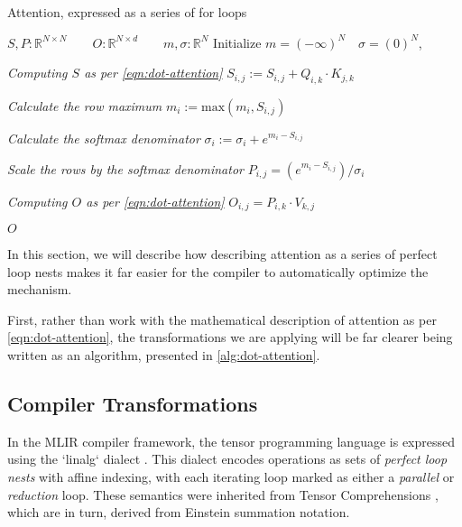 \documentclass[review, anonymous, sigplan]{acmart}
\begin{document}
\begin{algorithm}
  \caption{Attention, expressed as a series of for loops\label{alg:dot-attention}}
  \begin{algorithmic}[1]

    \State $S, P : \mathbb{R}^{N \times N} \qquad 
            O : \mathbb{R}^{N \times d} \qquad
            m, \sigma :\mathbb{R}^N$
    \State Initialize $m = (-\infty)^N \quad \sigma = (0)^N$,

    \State \emph{Computing $S$ as per \autoref{eqn:dot-attention}}
        \State $S_{i,j} := S_{i,j} + Q_{i,k} \cdot K_{j,k}$
      \EndFor
    \EndFor

    \State \emph{Calculate the row maximum}
        \State $m_i := \text{max}(m_i, S_{i,j})$
      \EndFor
    \EndFor

    \State \emph{Calculate the softmax denominator}
        \State $\sigma_i := \sigma_i + e^{m_i - S_{i,j}}$
      \EndFor
    \EndFor

    \State \emph{Scale the rows by the softmax denominator}
        \State $P_{i,j} = (e^{m_i - S_{i,j}}) / \sigma_i$
      \EndFor
    \EndFor

    \State \emph{Computing $O$ as per \autoref{eqn:dot-attention}}
        \State $O_{i,j} = P_{i,k} \cdot V_{k,j}$
      \EndFor
    \EndFor

    \Return $O$
  \EndFunction
  \end{algorithmic}
\end{algorithm}

In this section, we will describe how describing attention as a series of perfect loop nests makes it far easier for the compiler to automatically optimize the mechanism.

First, rather than work with the mathematical description of attention as per 
\autoref{eqn:dot-attention}, the transformations we are applying will be far clearer being written as an algorithm, presented in \autoref{alg:dot-attention}.


\subsection{Compiler Transformations}
In the MLIR compiler framework, the tensor programming language is expressed using the `linalg` dialect \cite{noauthor_linalg_nodate}. This dialect encodes operations as sets of \emph{perfect loop nests} with affine indexing, with each iterating loop marked as either a \emph{parallel} or \emph{reduction} loop. These semantics were inherited from Tensor Comprehensions 
\cite{noauthor_linalg_nodate, vasilache_tensor_2018}, which are in turn, derived from Einstein summation notation.
\end{document}

